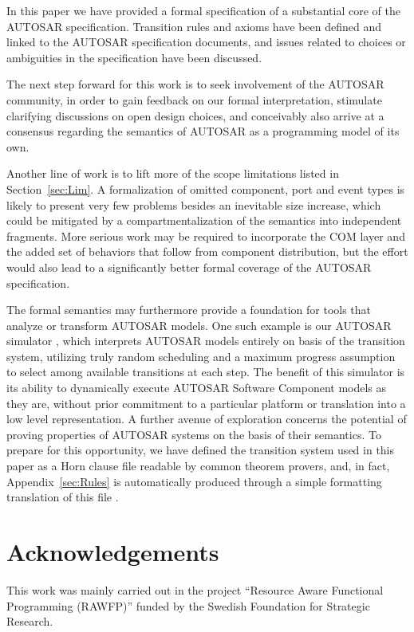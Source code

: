 \documentclass[10pt,conference]{IEEEtran}
\begin{document}
In this paper we have provided a formal specification of a substantial core of the AUTOSAR specification. Transition rules and axioms have been defined and linked to the AUTOSAR specification documents, and issues related to choices or ambiguities in the specification have been discussed.

The next step forward for this work is to seek involvement of the AUTOSAR community, in order to gain feedback on our formal interpretation, stimulate clarifying discussions on open design choices, and conceivably also arrive at a consensus regarding the semantics of AUTOSAR as a programming model of its own.

Another line of work is to lift more of the scope limitations listed in Section~\ref{sec:Lim}. A formalization of omitted component, port and event types is likely to present very few problems besides an inevitable size increase, which could be mitigated by a compartmentalization of the semantics into independent fragments. More serious work may be required to incorporate the COM layer and the added set of behaviors that follow from component distribution, but the effort would also lead to a significantly better formal coverage of the AUTOSAR specification.

The formal semantics may furthermore provide a foundation for tools that analyze or transform AUTOSAR models. One such example is our AUTOSAR simulator \cite{ARSim}, which interprets AUTOSAR models entirely on basis of the transition system, utilizing truly random scheduling and a maximum progress assumption to select among available transitions at each step. The benefit of this simulator is its ability to dynamically execute AUTOSAR Software Component models as they are, without prior commitment to a particular platform or translation into a low level representation. A further avenue of exploration concerns the potential of proving properties of AUTOSAR systems on the basis of their semantics. To prepare for this opportunity, we have defined the transition system used in this paper as a Horn clause file readable by common theorem provers, and, in fact, Appendix~\ref{sec:Rules} is automatically produced through a simple formatting translation of this file \cite{AR.eprover}.

\section{Acknowledgements}

This work was mainly carried out in the project ``Resource Aware
Functional Programming (RAWFP)'' funded by the Swedish Foundation for
Strategic Research.
\end{document}
